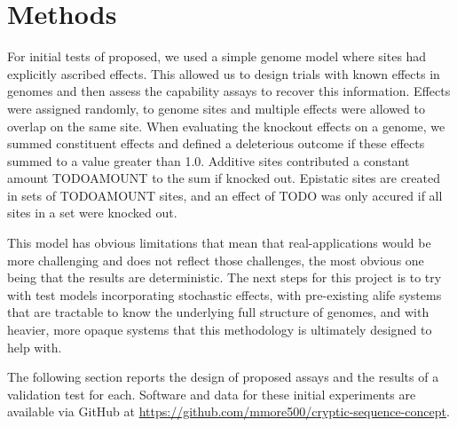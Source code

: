 \section{Methods} \label{sec:methods}

For initial tests of proposed, we used a simple genome model where sites had explicitly ascribed effects.
This allowed us to design trials with known effects in genomes and then assess the capability assays to recover this information.
Effects were assigned randomly, to genome sites and multiple effects were allowed to overlap on the same site.
When evaluating the knockout effects on a genome, we summed constituent effects and defined a deleterious outcome if these effects summed to a value greater than 1.0.
Additive sites contributed a constant amount TODOAMOUNT to the sum if knocked out.
Epistatic sites are created in sets of TODOAMOUNT sites, and an effect of TODO was only accured if all sites in a set were knocked out.

This model has obvious limitations that mean that real-applications would be more challenging and does not reflect those challenges, the most obvious one being that the results are deterministic.
The next steps for this project is to try with test models incorporating stochastic effects, with pre-existing alife systems that are tractable to know the underlying full structure of genomes, and with heavier, more opaque systems that this methodology is ultimately designed to help with.

The following section reports the design of proposed assays and the results of a validation test for each.
Software and data for these initial experiments are available via GitHub at \url{https://github.com/mmore500/cryptic-sequence-concept}.
